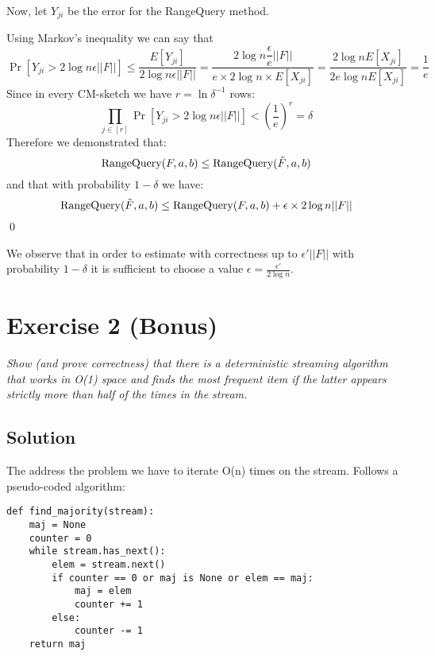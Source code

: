 \documentclass{article}
\begin{document}
Now, let $Y_{ji}$ be the error for the RangeQuery method.

Using Markov's inequality we can say that
\begin{displaymath}
    \Pr\left[Y_{ji} > 2\log n\epsilon ||F||\right]
    \leq\frac{E[Y_{ji}]}{2\log n\epsilon ||F||} =
    \frac{2\log n\dfrac{\epsilon}{e}||F||}{e \times 2\log n \times E[X_{ji}]} = \frac{2\log n E[X_{ji}]}{2e\log n E[X_{ji}]} = \dfrac{1}{e}
\end{displaymath}
Since in every CM-sketch we have $r = \ln\delta^{-1}$ rows:
\begin{displaymath}
	\prod_{j\in[r]}\Pr	\left[Y_{ji}>2\log n\epsilon ||F||\right] < \left(\dfrac{1}{e}\right)^r = \delta
\end{displaymath}
Therefore we demonstrated that:
\begin{displaymath}
    \text{RangeQuery}(F, a,b)\leq \text{RangeQuery}(\Tilde{F}, a,b)
\end{displaymath}
and that with probability $1-\delta$ we have:
\begin{displaymath}
    \text{RangeQuery}(\Tilde{F}, a,b)\leq \text{RangeQuery}(F, a,b) + \epsilon \times 2\log n||F||  
\end{displaymath} \qed


We observe that in order to estimate with correctness up to $\epsilon'||F||$
with probability $1-\delta$ it is sufficient to choose a value $\epsilon = \displaystyle\frac{\epsilon'}{2\log n}$.



\section{Exercise 2 (Bonus)}

\textit{Show (and prove correctness) that there is a deterministic streaming algorithm that works in O(1) space and finds the most frequent item if the latter appears strictly more than half of the times in the stream.}

\subsection{Solution}

The address the problem we have to iterate O(n) times on the stream. Follows a pseudo-coded algorithm:

\begin{lstlisting}
def find_majority(stream):
    maj = None
    counter = 0
    while stream.has_next():
        elem = stream.next()
        if counter == 0 or maj is None or elem == maj:
            maj = elem
            counter += 1
        else:
            counter -= 1
    return maj
\end{lstlisting}
\end{document}
